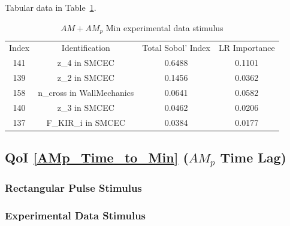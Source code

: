 \documentclass[12pt]{article}
\numberwithin{equation}{section}
\begin{document}
Tabular data in Table~\ref{qoi_AM_AMp_Min_ex}.
  
\begin{table}[h]
\centering
\begin{tabular}{cccc}
Index & Identification & Total Sobol' Index & LR Importance \\
141 & z\_4 in SMCEC & 0.6488 & 0.1101\\
139 &  z\_2 in SMCEC & 0.1456 & 0.0362\\
158 & n\_cross in WallMechanics &  0.0641 & 0.0582\\
140 & z\_3 in SMCEC & 0.0462 & 0.0206\\
137 & F\_KIR\_i in SMCEC & 0.0384 & 0.0177\\
\end{tabular}
\caption{$AM+AM_p$ Min experimental data stimulus}
\label{qoi_AM_AMp_Min_ex}
\end{table}

\newpage
\subsection{QoI \eqref{AMp_Time_to_Min} ($AM_p$ Time Lag)}

\subsubsection{Rectangular Pulse Stimulus}


\subsubsection{Experimental Data Stimulus}
\end{document}
